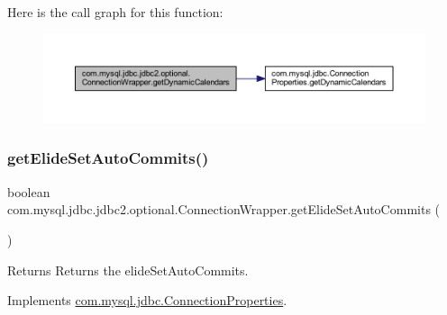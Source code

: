 Here is the call graph for this function\+:
\nopagebreak
\begin{figure}[H]
\begin{center}
\leavevmode
\includegraphics[width=350pt]{classcom_1_1mysql_1_1jdbc_1_1jdbc2_1_1optional_1_1_connection_wrapper_a0b2ae292dd1bf086fa44c57a0cc34264_cgraph}
\end{center}
\end{figure}
\mbox{\label{classcom_1_1mysql_1_1jdbc_1_1jdbc2_1_1optional_1_1_connection_wrapper_a764dc2884e41a1c01956ef80e7ed578a}} 
\subsubsection{\texorpdfstring{get\+Elide\+Set\+Auto\+Commits()}{getElideSetAutoCommits()}}
{\footnotesize\ttfamily boolean com.\+mysql.\+jdbc.\+jdbc2.\+optional.\+Connection\+Wrapper.\+get\+Elide\+Set\+Auto\+Commits (\begin{DoxyParamCaption}{ }\end{DoxyParamCaption})}

\begin{DoxyReturn}{Returns}
Returns the elide\+Set\+Auto\+Commits. 
\end{DoxyReturn}


Implements \mbox{\hyperlink{interfacecom_1_1mysql_1_1jdbc_1_1_connection_properties_ad0c5071cd7d12eadb159a6b0cf8066c3}{com.\+mysql.\+jdbc.\+Connection\+Properties}}.

